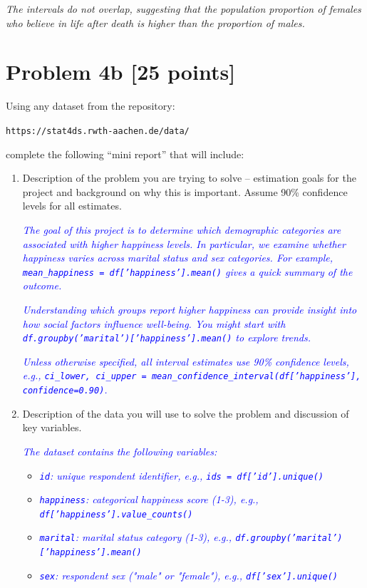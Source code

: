 \documentclass[12pt]{article}
\begin{document}
\textit{The intervals do not overlap, suggesting that the population proportion of females who believe in life after death is higher than the proportion of males.}
\section*{Problem 4b [25 points]}
Using any dataset from the repository:

\texttt{https://stat4ds.rwth-aachen.de/data/}

complete the following ``mini report'' that will include:


\begin{enumerate}

\item[(i)] Description of the problem you are trying to solve -- estimation goals for the project and background on why this is important. Assume 90\% confidence levels for all estimates.

\textit{\textcolor{blue}{The goal of this project is to determine which demographic categories are associated with higher happiness levels. In particular, we examine whether happiness varies across marital status and sex categories. For example, \texttt{mean\_happiness = df['happiness'].mean()} gives a quick summary of the outcome.}}

\textit{\textcolor{blue}{Understanding which groups report higher happiness can provide insight into how social factors influence well-being. You might start with \texttt{df.groupby('marital')['happiness'].mean()} to explore trends.}}

\textit{\textcolor{blue}{Unless otherwise specified, all interval estimates use 90\% confidence levels, e.g., \texttt{ci\_lower, ci\_upper = mean\_confidence\_interval(df['happiness'], confidence=0.90)}.}}

\item[(ii)] Description of the data you will use to solve the problem and discussion of key variables.

\textit{\textcolor{blue}{The dataset contains the following variables:}}

\begin{itemize}
\item \textit{\textcolor{blue}{\texttt{id}: unique respondent identifier, e.g., \texttt{ids = df['id'].unique()}}}
\item \textit{\textcolor{blue}{\texttt{happiness}: categorical happiness score (1-3), e.g., \texttt{df['happiness'].value\_counts()}}}
\item \textit{\textcolor{blue}{\texttt{marital}: marital status category (1-3), e.g., \texttt{df.groupby('marital')['happiness'].mean()}}}
\item \textit{\textcolor{blue}{\texttt{sex}: respondent sex ("male" or "female"), e.g., \texttt{df['sex'].unique()}}}
\end{itemize}


\end{enumerate}
\end{document}

